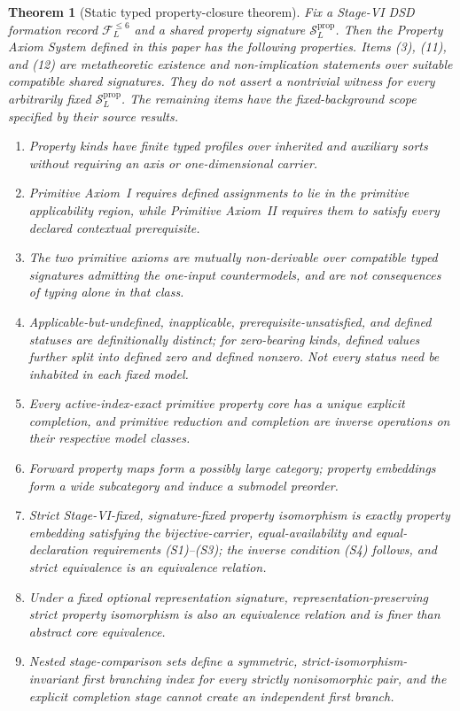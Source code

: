 \documentclass[11pt]{article}
\newcommand{\FVI}{\mathcal F_{L}^{\le 6}}
\newcommand{\Sprop}{\mathcal S_{L}^{\mathrm{prop}}}
\newtheorem{theorem}{Theorem}[section]
\theoremstyle{definition}
\theoremstyle{remark}
\begin{document}
\begin{theorem}[Static typed property-closure theorem]
\label{thm:main}
Fix a Stage-VI DSD formation record \(\FVI\) and a shared property signature \(\Sprop\).
Then the Property Axiom System defined in this paper has the following properties.
Items (3), (11), and (12) are metatheoretic existence and
non-implication statements over suitable compatible shared
signatures. They do not assert a nontrivial witness for every
arbitrarily fixed \(\Sprop\). The remaining items have the
fixed-background scope specified by their source results.
\begin{enumerate}[label=(\arabic*)]
\item Property kinds have finite typed profiles over inherited and auxiliary sorts without requiring an axis or one-dimensional carrier.
\item Primitive Axiom~I requires defined assignments to lie in the primitive applicability region, while Primitive Axiom~II requires them to satisfy every declared contextual prerequisite.
\item The two primitive axioms are mutually non-derivable over compatible typed signatures admitting the one-input countermodels, and are not consequences of typing alone in that class.
\item Applicable-but-undefined, inapplicable, prerequisite-unsatisfied, and defined statuses are definitionally distinct; for zero-bearing kinds, defined values further split into defined zero and defined nonzero. Not every status need be inhabited in each fixed model.
\item Every active-index-exact primitive property core has a unique explicit completion, and primitive reduction and completion are inverse operations on their respective model classes.
\item Forward property maps form a possibly large category; property embeddings form a wide subcategory and induce a submodel preorder.
\item Strict Stage-VI-fixed, signature-fixed property isomorphism is exactly property embedding satisfying the bijective-carrier, equal-availability and equal-declaration requirements (S1)--(S3); the inverse condition (S4) follows, and strict equivalence is an equivalence relation.
\item Under a fixed optional representation signature, representation-preserving strict property isomorphism is also an equivalence relation and is finer than abstract core equivalence.
\item Nested stage-comparison sets define a symmetric, strict-isomorphism-invariant first branching index for every strictly nonisomorphic pair, and the explicit completion stage cannot create an independent first branch.

\end{enumerate}
\end{theorem}
\end{document}
